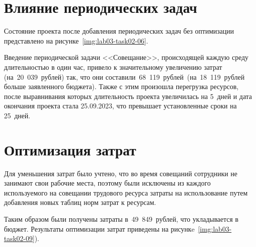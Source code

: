 \section{Влияние периодических задач}

Состояние проекта после добавления периодических задач без оптимизации
представлено на рисунке~\ref{img:lab03-task02-06}.


\vspace{1cm}

Введение периодической задачи <<Совещание>>, происходящей каждую среду
длительностью в один час, привело к значительному увеличению затрат
(на~20~039~рублей) так, что они составили~68~119~рублей~(на~18~119~рублей больше
заявленного бюджета). Также с этим произошла перегрузка ресурсов, после
выравнивания которых длительность проекта увеличилась на 5~дней и дата окончания
проекта стала 25.09.2023, что превышает установленные сроки на 25~дней.

\section{Оптимизация затрат}

Для уменьшения затрат было учтено, что во время совещаний сотрудники не занимают
свои рабочие места, поэтому были исключены из каждого используемого на совещании
трудового ресурса затраты на использование путем добавления новых таблиц норм
затрат к ресурсам.

Таким образом были получены затраты в~49~849~рублей, что укладывается в бюджет.
Результаты оптимизации затрат приведены на рисункe~\ref{img:lab03-task02-09}).

